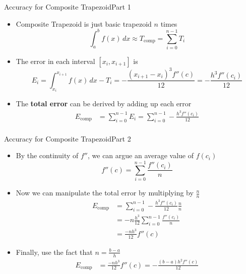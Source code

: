 \documentclass[10pt]{beamer}
\begin{document}
\begin{frame}{Accuracy for Composite Trapezoid}{Part 1}
\begin{itemize}
    \item Composite Trapezoid is just basic trapezoid $n$ times
        \begin{equation*}
          \int_a^b f(x)\,dx \approx T_{\text{comp}} = \sum_{i=0}^{n-1}T_i
        \end{equation*}
    \item The error in each interval $[x_i,x_{i+1}]$ is
        \begin{equation*}
        E_i = \int_{x_i}^{x_{i+1}}f(x)\,dx-T_i= -\frac{(x_{i+1}-x_i)^3 f''(c)}{12} =-\frac{h^3 f''(c_i)}{12}
        \end{equation*}
    \item The \textbf{total error} can be derived by adding up each error
        \begin{align*}
        E_{\textrm{comp}} &= \sum_{i=0}^{n-1} E_i = \sum_{i=0}^{n-1}  -\frac{h^3 f''(c_i)}{12}\\ 
        \end{align*}
\end{itemize}
\end{frame}
\begin{frame}[shrink]{Accuracy for Composite Trapezoid}{Part 2}
\begin{itemize}
    \item By the continuity of $f''$, we can argue an average value of $f(c_i)$
        $$
        f''(c)=\sum_{i=0}^{n-1} \frac{f''(c_i)}{n}
        $$
    \item Now we can manipulate the total error by multiplying by $\frac{n}{n}$
        \begin{align*}
        E_{\textrm{comp}} & = \sum_{i=0}^{n-1}  -\frac{h^3 f''(c_i)}{12} \frac{n}{n}\\
        &= -n \frac{h^3}{12} \sum_{i=0}^{n-1}  \frac{f''(c_i)}{n}\\ 
         & = \frac{-nh^3}{12} f''(c)
        \end{align*}
    \item Finally, use the fact that $n=\frac{b-a}{h}$
        \begin{align*}
        E_{\textrm{comp}} &= \frac{-nh^3}{12} f''(c)  = -\frac{(b-a) h^2 f''(c)}{12}
        \end{align*}
\end{itemize}
\end{frame}
\end{document}

